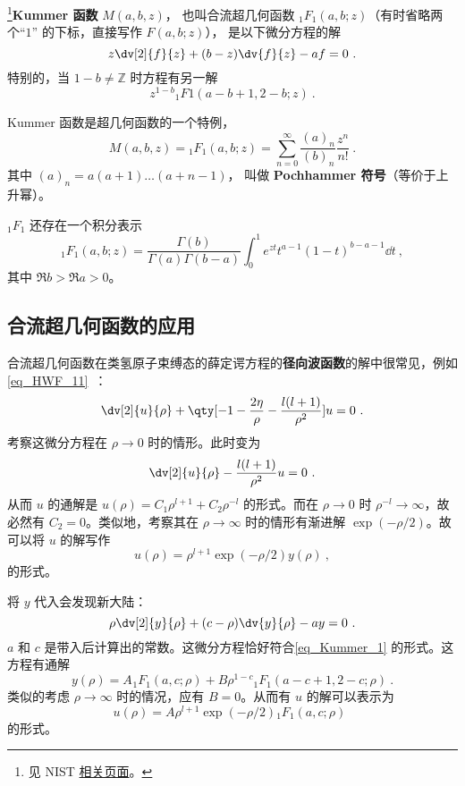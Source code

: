 
\begin{issues}
\issueDraft
\end{issues}

\footnote{见 NIST \href{https://dlmf.nist.gov/13.2}{相关页面}。}\textbf{Kummer 函数} $M(a, b, z)$， 也叫合流超几何函数 $_1F_1(a, b; z)$（有时省略两个“$1$” 的下标，直接写作 $F(a, b; z)$）， 是以下微分方程的解
\begin{equation}\label{eq_Kummer_1}
z\dv[2]{f}{z} + (b-z)\dv{f}{z} - a f = 0~.
\end{equation}
特别的，当 $1 - b \neq \mathbb Z$ 时方程有另一解
$$z^{1-b} {_1F1}(a-b+1, 2-b; z)~.$$

Kummer 函数是超几何函数的一个特例， 
\begin{equation}
M(a, b, z) = {_1F_1}(a, b; z) = \sum_{n=0}^\infty \frac{(a)_n}{(b)_n} \frac{z^n}{n!}~.
\end{equation}
其中 $(a)_n = a(a+1)\dots(a+n-1)$， 叫做 \textbf{Pochhammer 符号}（等价于上升幂）。

${_1F_1}$ 还存在一个积分表示
\begin{equation}
{_1F_1}(a, b; z) = \frac{\Gamma(b)}{\Gamma(a) \Gamma(b-a)} \int_0^1 {e^{zt} t^{a-1} (1-t)^{b-a-1}\dd t} ~,
\end{equation}
其中 $\Re b > \Re a > 0$。

\subsection{合流超几何函数的应用}
合流超几何函数在类氢原子束缚态的薛定谔方程的\textbf{径向波函数}的解中很常见，例如\autoref{eq_HWF_11}~：
\begin{equation}
\dv[2]{u}{\rho} + \qty[-1 - \frac{2\eta}{\rho} - \frac{l(l+1)}{\rho^2}]u = 0~.
\end{equation}
考察这微分方程在 $\rho \rightarrow 0$ 时的情形。此时变为
\begin{equation}
\dv[2]{u}{\rho} - \frac{l(l+1)}{\rho^2} u = 0 ~.
\end{equation}
从而 $u$ 的通解是 $u(\rho) = C_1 \rho^{l+1} + C_2 \rho^{-l}$ 的形式。而在 $\rho \rightarrow 0$ 时 $\rho^{-l} \rightarrow \infty$，故必然有 $C_2 = 0$。类似地，考察其在 $\rho \rightarrow \infty$ 时的情形有渐进解 $\exp(-\rho/2)$。故可以将 $u$ 的解写作
\begin{equation}
u(\rho) = \rho^{l+1} \exp(-\rho/2) y(\rho) ~,
\end{equation}
的形式。

将 $y$ 代入会发现新大陆：
\begin{equation}
\rho \dv[2]{y}{\rho} + (c-\rho)\dv{y}{\rho} -ay = 0 ~.
\end{equation}
$a$ 和 $c$ 是带入后计算出的常数。这微分方程恰好符合\autoref{eq_Kummer_1} 的形式。这方程有通解
\begin{equation}
y(\rho) = A_{} {}_{1}F_1(a, c; \rho) + B \rho^{1-c}{}  _{1}F_{1}(a-c+1, 2-c; \rho) ~.
\end{equation}
类似的考虑 $\rho\rightarrow \infty$ 时的情况，应有 $B=0$。从而有 $u$ 的解可以表示为
\begin{equation}
u(\rho) = A \rho^{l+1} \exp(-\rho/2) {_1F_1}(a, c; \rho) ~~
\end{equation}
的形式。
